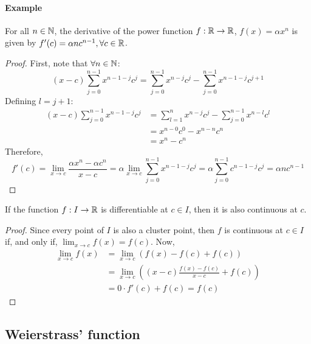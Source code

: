 \paragraph{Example} For all $n \in \mathbb{N}$, the derivative of the power function $f: \mathbb{R} \to \mathbb{R}$, $f(x) = \alpha x^n$ is given by $f'(c) = \alpha n c^{n-1}, \forall c \in \mathbb{R}$.

\begin{proof}
    First, note that $\forall n \in \mathbb{N}$:
    \begin{equation*}
        (x-c) \sum \limits_{j=0}^{n-1} x^{n-1-j}c^j = \sum \limits_{j=0}^{n-1}x^{n-j}c^j - \sum \limits_{j=0}^{n-1} x^{n-1-j}c^{j+1}
    \end{equation*}
    Defining $l = j + 1$:
    \begin{align*}
        (x-c) \sum \limits_{j=0}^{n-1} x^{n-1-j}c^j &= \sum \limits_{l=1}^{n}x^{n-j}c^j - \sum \limits_{j=0}^{n-1} x^{n-l}c^{l} \\
        &= x^{n-0}c^0 - x^{n-n}c^n \\
        &= x^n - c^n
    \end{align*}
    Therefore,
    \begin{equation*}
        f'(c) = \lim \limits_{x \to c} \frac{\alpha x^n - \alpha c^n}{x-c} = \alpha \lim \limits_{x \to c} \sum \limits_{j=0}^{n-1} x^{n-1-j}c^j = \alpha \sum \limits_{j=0}^{n-1} c^{n-1-j}c^j = \alpha n c^{n-1}
    \end{equation*}
\end{proof}

\begin{theorem}
    If the function $f: I \to \mathbb{R}$ is differentiable at $c \in I$, then it is also continuous at $c$.
\end{theorem}

\begin{proof}
    Since every point of $I$ is also a cluster point, then $f$ is continuous at $c \in I$ if, and only if, $\lim_{x \to c} f(x) = f(c)$. Now, 
    \begin{align*}
        \lim \limits_{x \to c} f(x) &= \lim \limits_{x \to c} (f(x) - f(c) + f(c)) \\
        &= \lim \limits_{x \to c} \left( (x-c)\frac{f(x)-f(c)}{x-c} + f(c)\right) \\
        &= 0 \cdot f'(c) + f(c) = f(c)
    \end{align*}
\end{proof}

\subsection{Weierstrass' function}

